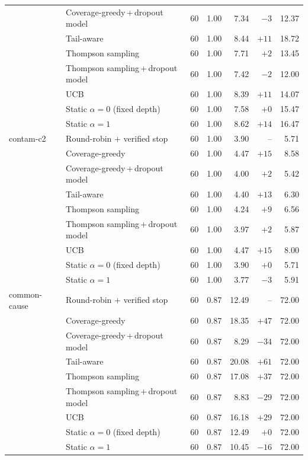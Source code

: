 \begin{table}[!t]
\begin{tabular}{@{}llrrrrr@{}}
 & Coverage-greedy\,+\,dropout model & 60 & 1.00 & 7.34 & $-3$ & 12.37 \\
 & Tail-aware & 60 & 1.00 & 8.44 & $+11$ & 18.72 \\
 & Thompson sampling & 60 & 1.00 & 7.71 & $+2$ & 13.45 \\
 & Thompson sampling\,+\,dropout model & 60 & 1.00 & 7.42 & $-2$ & 12.00 \\
 & UCB & 60 & 1.00 & 8.39 & $+11$ & 14.07 \\
 & Static $\alpha{=}0$ (fixed depth) & 60 & 1.00 & 7.58 & $+0$ & 15.47 \\
 & Static $\alpha{=}1$ & 60 & 1.00 & 8.62 & $+14$ & 16.47 \\
\midrule
contam-c2 & Round-robin + verified stop & 60 & 1.00 & 3.90 & -- & 5.71 \\
 & Coverage-greedy & 60 & 1.00 & 4.47 & $+15$ & 8.58 \\
 & Coverage-greedy\,+\,dropout model & 60 & 1.00 & 4.00 & $+2$ & 5.42 \\
 & Tail-aware & 60 & 1.00 & 4.40 & $+13$ & 6.30 \\
 & Thompson sampling & 60 & 1.00 & 4.24 & $+9$ & 6.56 \\
 & Thompson sampling\,+\,dropout model & 60 & 1.00 & 3.97 & $+2$ & 5.87 \\
 & UCB & 60 & 1.00 & 4.47 & $+15$ & 8.00 \\
 & Static $\alpha{=}0$ (fixed depth) & 60 & 1.00 & 3.90 & $+0$ & 5.71 \\
 & Static $\alpha{=}1$ & 60 & 1.00 & 3.77 & $-3$ & 5.91 \\
\midrule
common-cause & Round-robin + verified stop & 60 & 0.87 & 12.49 & -- & 72.00 \\
 & Coverage-greedy & 60 & 0.87 & 18.35 & $+47$ & 72.00 \\
 & Coverage-greedy\,+\,dropout model & 60 & 0.87 & 8.29 & $-34$ & 72.00 \\
 & Tail-aware & 60 & 0.87 & 20.08 & $+61$ & 72.00 \\
 & Thompson sampling & 60 & 0.87 & 17.08 & $+37$ & 72.00 \\
 & Thompson sampling\,+\,dropout model & 60 & 0.87 & 8.83 & $-29$ & 72.00 \\
 & UCB & 60 & 0.87 & 16.18 & $+29$ & 72.00 \\
 & Static $\alpha{=}0$ (fixed depth) & 60 & 0.87 & 12.49 & $+0$ & 72.00 \\
 & Static $\alpha{=}1$ & 60 & 0.87 & 10.45 & $-16$ & 72.00 \\
\bottomrule
\end{tabular}
\end{table}
